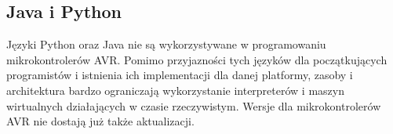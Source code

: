 \subsection{Java i Python}
Języki Python oraz Java nie są wykorzystywane w programowaniu mikrokontrolerów AVR. Pomimo przyjazności tych języków dla początkujących programistów i istnienia ich implementacji dla danej platformy, zasoby i architektura bardzo ograniczają wykorzystanie interpreterów i maszyn wirtualnych działających w czasie rzeczywistym. Wersje dla mikrokontrolerów AVR nie dostają już także aktualizacji.

%
%
%




